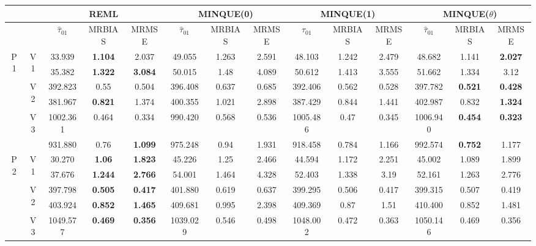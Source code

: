 \documentclass[12pt,a4paper]{article}
\begin{document}
\begin{sidewaystable}[ht]
\centering
{\footnotesize
\begin{tabular}{cc|ccc|ccc|ccc|ccc|}
   & & \multicolumn{3}{c|}{REML}&\multicolumn{3}{c|}{MINQUE(0)}&\multicolumn{3}{c|}{MINQUE(1)}&\multicolumn{3}{c|}{MINQUE($\theta$)}\\ \hline
 &  & $\hat{\tau}_{01}$ & MRBIAS & MRMSE & $\hat{\tau}_{01}$ & MRBIAS & MRMSE & $\hat{\tau}_{01}$ & MRBIAS & MRMSE & $\hat{\tau}_{01}$ & MRBIAS & MRMSE \\ 
  \hline
\multirow{6}{*}{P1} & \multirow{2}{*}{V1} & 33.939 & \textbf{1.104} & 2.037 & 49.055 & 1.263 & 2.591 & 48.103 & 1.242 & 2.479 & 48.682 & 1.141 & \textbf{2.027} \\ 
   &  & 35.382 & \textbf{1.322} & \textbf{3.084} & 50.015 & 1.48 & 4.089 & 50.612 & 1.413 & 3.555 & 51.662 & 1.334 & 3.12 \\ 
   & \multirow{2}{*}{V2} & 392.823 & 0.55 & 0.504 & 396.408 & 0.637 & 0.685 & 392.406 & 0.562 & 0.528 & 397.782 & \textbf{0.521} & \textbf{0.428} \\ 
   &  & 381.967 & \textbf{0.821} & 1.374 & 400.355 & 1.021 & 2.898 & 387.429 & 0.844 & 1.441 & 402.987 & 0.832 & \textbf{1.324} \\ 
   & \multirow{2}{*}{V3} & 1002.361 & 0.464 & 0.334 & 990.420 & 0.568 & 0.536 & 1005.486 & 0.47 & 0.345 & 1006.940 & \textbf{0.454} & \textbf{0.323} \\ 
   &  & 931.880 & 0.76 & \textbf{1.099} & 975.248 & 0.94 & 1.931 & 918.458 & 0.784 & 1.166 & 992.574 & \textbf{0.752} & 1.177 \\ 
   \hline \hline\multirow{6}{*}{P2} & \multirow{2}{*}{V1} & 30.270 & \textbf{1.06} & \textbf{1.823} & 45.226 & 1.25 & 2.466 & 44.594 & 1.172 & 2.251 & 45.002 & 1.089 & 1.899 \\ 
   &  & 37.676 & \textbf{1.244} & \textbf{2.766} & 54.001 & 1.464 & 4.328 & 52.403 & 1.338 & 3.19 & 52.161 & 1.263 & 2.776 \\ 
   & \multirow{2}{*}{V2} & 397.798 & \textbf{0.505} & \textbf{0.417} & 401.880 & 0.619 & 0.637 & 399.295 & 0.506 & 0.417 & 399.315 & 0.507 & 0.419 \\ 
   &  & 403.924 & \textbf{0.852} & \textbf{1.465} & 409.681 & 0.995 & 2.398 & 409.369 & 0.87 & 1.51 & 410.400 & 0.852 & 1.481 \\ 
   & \multirow{2}{*}{V3} & 1049.577 & \textbf{0.469} & \textbf{0.356} & 1039.029 & 0.546 & 0.498 & 1048.002 & 0.472 & 0.363 & 1050.146 & 0.469 & 0.356 \\ 

\end{tabular}}
\end{sidewaystable}
\end{document}
